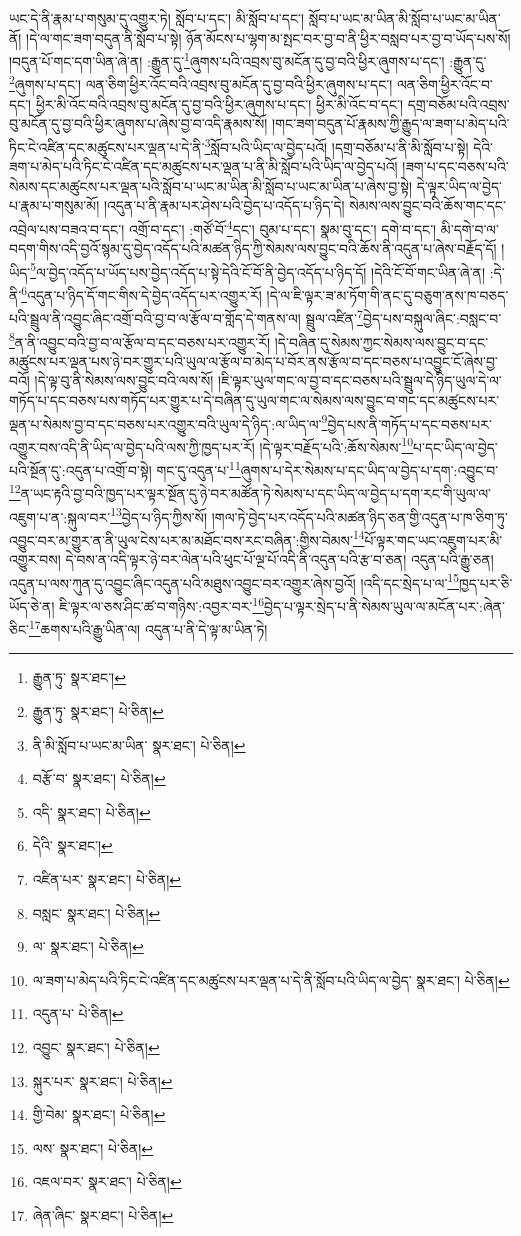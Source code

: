ཡང་དེ་ནི་རྣམ་པ་གསུམ་དུ་འགྱུར་ཏེ། སློབ་པ་དང་། མི་སློབ་པ་དང་། སློབ་པ་ཡང་མ་ཡིན་མི་སློབ་པ་ཡང་མ་ཡིན་ནོ། །དེ་ལ་གང་ཟག་བདུན་ནི་སློབ་པ་སྟེ། ཉོན་མོངས་པ་ལྷག་མ་སྤང་བར་བྱ་བ་ནི་ཕྱིར་བསླབ་པར་བྱ་བ་ཡོད་པས་སོ། །བདུན་པོ་གང་དག་ཡིན་ཞེ་ན། :རྒྱུན་དུ་\footnote{རྒྱུན་ཏུ་  སྣར་ཐང་། }ཞུགས་པའི་འབྲས་བུ་མངོན་དུ་བྱ་བའི་ཕྱིར་ཞུགས་པ་དང་། :རྒྱུན་དུ་\footnote{རྒྱུན་ཏུ་  སྣར་ཐང་།  པེ་ཅིན། }ཞུགས་པ་དང་། ལན་ཅིག་ཕྱིར་འོང་བའི་འབྲས་བུ་མངོན་དུ་བྱ་བའི་ཕྱིར་ཞུགས་པ་དང་། ལན་ཅིག་ཕྱིར་འོང་བ་དང་། ཕྱིར་མི་འོང་བའི་འབྲས་བུ་མངོན་དུ་བྱ་བའི་ཕྱིར་ཞུགས་པ་དང་། ཕྱིར་མི་འོང་བ་དང་། དགྲ་བཅོམ་པའི་འབྲས་བུ་མངོན་དུ་བྱ་བའི་ཕྱིར་ཞུགས་པ་ཞེས་བྱ་བ་འདི་རྣམས་སོ། །གང་ཟག་བདུན་པོ་རྣམས་ཀྱི་རྒྱུད་ལ་ཟག་པ་མེད་པའི་ཏིང་ངེ་འཛིན་དང་མཚུངས་པར་ལྡན་པ་དེ་ནི་\footnote{ནི་མི་སློབ་པ་ཡང་མ་ཡིན་  སྣར་ཐང་།  པེ་ཅིན། }སློབ་པའི་ཡིད་ལ་བྱེད་པའོ། །དགྲ་བཅོམ་པ་ནི་མི་སློབ་པ་སྟེ། དེའི་ཟག་པ་མེད་པའི་ཏིང་ངེ་འཛིན་དང་མཚུངས་པར་ལྡན་པ་ནི་མི་སློབ་པའི་ཡིད་ལ་བྱེད་པའོ། །ཟག་པ་དང་བཅས་པའི་སེམས་དང་མཚུངས་པར་ལྡན་པའི་སློབ་པ་ཡང་མ་ཡིན་མི་སློབ་པ་ཡང་མ་ཡིན་པ་ཞེས་བྱ་སྟེ། དེ་ལྟར་ཡིད་ལ་བྱེད་པ་རྣམ་པ་གསུམ་མོ། །འདུན་པ་ནི་རྣམ་པར་ཤེས་པའི་བྱེད་པ་འདོད་པ་ཉིད་དེ། སེམས་ལས་བྱུང་བའི་ཆོས་གང་དང་འབྲེལ་པས་བཟའ་བ་དང་། འགྲོ་བ་དང་། :གཙོ་བོ་\footnote{བརྩོ་བ་  སྣར་ཐང་།  པེ་ཅིན། }དང་། བུམ་པ་དང་། སྣམ་བུ་དང་། དགེ་བ་དང་། མི་དགེ་བ་ལ་བདག་གིས་འདི་བྱའོ་སྙམ་དུ་བྱེད་འདོད་པའི་མཚན་ཉིད་ཀྱི་སེམས་ལས་བྱུང་བའི་ཆོས་ནི་འདུན་པ་ཞེས་བརྗོད་དོ། །ཡིད་\footnote{འདི་  སྣར་ཐང་།  པེ་ཅིན། }ལ་བྱེད་འདོད་པ་ཡོད་པས་བྱེད་འདོད་པ་སྟེ་དེའི་ངོ་བོ་ནི་བྱེད་འདོད་པ་ཉིད་དོ། །དེའི་ངོ་བོ་གང་ཡིན་ཞེ་ན། :དེ་ནི་\footnote{དེའི་  སྣར་ཐང་། }འདུན་པ་ཉིད་དོ་གང་གིས་དེ་བྱེད་འདོད་པར་འགྱུར་རོ། །དེ་ལ་ཇི་ལྟར་ཟ་མ་ཏོག་གི་ནང་དུ་བཅུག་ནས་ཁ་བཅད་པའི་སྦྲུལ་ནི་འབྱུང་ཞིང་འགྲོ་བའི་བྱ་བ་ལ་རྩོལ་བ་གློད་དེ་གནས་ལ། སྦྲུལ་འཛིན་\footnote{འཛིན་པར་  སྣར་ཐང་།  པེ་ཅིན། }བྱེད་པས་བསྐུལ་ཞིང་:བསླང་བ་\footnote{བསླང་  སྣར་ཐང་།  པེ་ཅིན། }ན་ནི་འབྱུང་བའི་བྱ་བ་ལ་རྩོལ་བ་དང་བཅས་པར་འགྱུར་རོ། །དེ་བཞིན་དུ་སེམས་ཀྱང་སེམས་ལས་བྱུང་བ་དང་མཚུངས་པར་ལྡན་པས་ཉེ་བར་གྱུར་པའི་ཡུལ་ལ་རྩོལ་བ་མེད་པ་བོར་ནས་རྩོལ་བ་དང་བཅས་པ་འབྱུང་ངོ་ཞེས་བྱ་བའོ། །དེ་ལྟ་བུ་ནི་སེམས་ལས་བྱུང་བའི་ལས་སོ། །ཇི་ལྟར་ཡུལ་གང་ལ་བྱ་བ་དང་བཅས་པའི་སྦྲུལ་དེ་ཉིད་ཡུལ་དེ་ལ་གཏོད་པ་དང་བཅས་པས་གཏོད་པར་གྱུར་པ་དེ་བཞིན་དུ་ཡུལ་གང་ལ་སེམས་ལས་བྱུང་བ་གང་དང་མཚུངས་པར་ལྡན་པ་སེམས་བྱ་བ་དང་བཅས་པར་འགྱུར་བའི་ཡུལ་དེ་ཉིད་:ལ་ཡིད་ལ་\footnote{ལ་  སྣར་ཐང་།  པེ་ཅིན། }བྱེད་པས་ནི་གཏོད་པ་དང་བཅས་པར་འགྱུར་བས་འདི་ནི་ཡིད་ལ་བྱེད་པའི་ལས་ཀྱི་ཁྱད་པར་རོ། །དེ་ལྟར་བརྗོད་པའི་:ཆོས་སེམས་\footnote{ལ་ཟག་པ་མེད་པའི་ཏིང་ངེ་འཛིན་དང་མཚུངས་པར་ལྡན་པ་དེ་ནི་སློབ་པའི་ཡིད་ལ་བྱེད་  སྣར་ཐང་།  པེ་ཅིན། }པ་དང་ཡིད་ལ་བྱེད་པའི་སྔོན་དུ་:འདུན་པ་འགྲོ་བ་སྟེ། གང་དུ་འདུན་པ་\footnote{འདུན་པ་  པེ་ཅིན། }ཞུགས་པ་དེར་སེམས་པ་དང་ཡིད་ལ་བྱེད་པ་དག་:འབྱུང་བ་\footnote{འབྱུང་  སྣར་ཐང་།  པེ་ཅིན། }ན་ཡང་རྟའི་བྱ་བའི་ཁྱད་པར་ལྟར་སྔོན་དུ་ཉེ་བར་མཚོན་ཏེ་སེམས་པ་དང་ཡིད་ལ་བྱེད་པ་དག་རང་གི་ཡུལ་ལ་འཇུག་པ་ན་:སྐུལ་བར་\footnote{སྐུར་པར་  སྣར་ཐང་།  པེ་ཅིན། }བྱེད་པ་ཉིད་ཀྱིས་སོ། །གལ་ཏེ་བྱེད་པར་འདོད་པའི་མཚན་ཉིད་ཅན་གྱི་འདུན་པ་ཁ་ཅིག་ཏུ་འབྱུང་བར་མ་གྱུར་ན་ནི་ཡུལ་ངེས་པར་མ་མཐོང་བས་རང་བཞིན་:གྱིས་བེམས་\footnote{གྱི་བེམ་  སྣར་ཐང་།  པེ་ཅིན། }པོ་ལྟར་གང་ཡང་འཇུག་པར་མི་འགྱུར་བས། དེ་བས་ན་འདི་ལྟར་ཉེ་བར་ལེན་པའི་ཕུང་པོ་ལྔ་པོ་འདི་ནི་འདུན་པའི་རྩ་བ་ཅན། འདུན་པའི་རྒྱུ་ཅན། འདུན་པ་ལས་ཀུན་དུ་འབྱུང་ཞིང་འདུན་པའི་མཐུས་འབྱུང་བར་འགྱུར་ཞེས་བྱའོ། །འདི་དང་སྲེད་པ་ལ་\footnote{ལས་  སྣར་ཐང་།  པེ་ཅིན། }ཁྱད་པར་ཅི་ཡོད་ཅེ་ན། ཇི་ལྟར་ལ་ཅས་ཤིང་ཚ་བ་གཉིས་:འབྱར་བར་\footnote{འཇལ་བར་  སྣར་ཐང་།  པེ་ཅིན། }བྱེད་པ་ལྟར་སྲེད་པ་ནི་སེམས་ཡུལ་ལ་མངོན་པར་:ཞེན་ཅིང་\footnote{ཞེན་ཞིང་  སྣར་ཐང་།  པེ་ཅིན། }ཆགས་པའི་རྒྱུ་ཡིན་ལ། འདུན་པ་ནི་དེ་ལྟ་མ་ཡིན་ཏེ། 